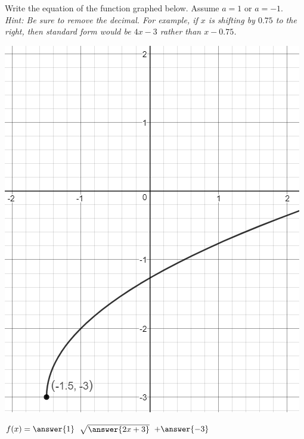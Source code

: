 \documentclass{ximera}
\begin{document}
\begin{question}
Write the equation of the function graphed below. Assume $a = 1$ or $a = -1$. \\

\textit{Hint: Be sure to remove the decimal. For example, if $x$ is shifting by $0.75$ to the right, then standard form would be $4x-3$ rather than $x-0.75$.}

\includegraphics{graphRadicalQ2.png}

$f(x) = \answer{1}$ $\sqrt{\answer{2x+3}}$ $+ \answer{-3}$

\end{question}
\end{document}
